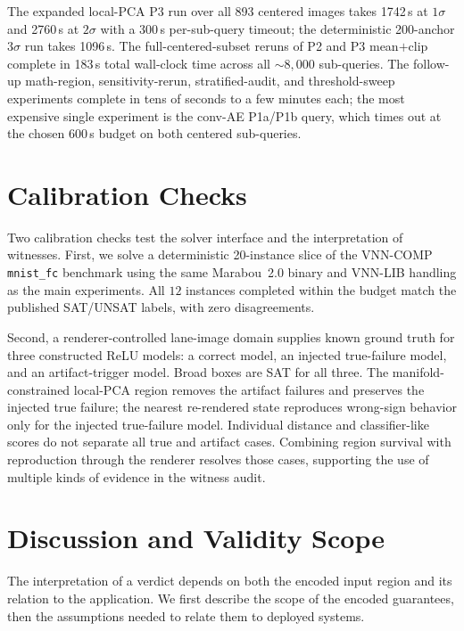 \documentclass[twocolumn,smallextended,runningheads]{svjour3}
\begin{document}
The expanded local-PCA P3 run over all 893 centered images takes 1742\,s at $1\sigma$ and 2760\,s at $2\sigma$ with a 300\,s per-sub-query timeout; the deterministic 200-anchor $3\sigma$ run takes 1096\,s. The full-centered-subset reruns of P2 and P3 mean$+$clip complete in 183\,s total wall-clock time across all $\sim 8{,}000$ sub-queries. The follow-up math-region, sensitivity-rerun, stratified-audit, and threshold-sweep experiments complete in tens of seconds to a few minutes each; the most expensive single experiment is the conv-AE P1a/P1b query, which times out at the chosen $600$\,s budget on both centered sub-queries.

\section{Calibration Checks}
\label{sec:calibration}

Two calibration checks test the solver interface and the interpretation of witnesses. First, we solve a deterministic 20-instance slice of the VNN-COMP \texttt{mnist\_fc} benchmark using the same Marabou~2.0 binary and VNN-LIB handling as the main experiments. All $12$ instances completed within the budget match the published SAT/UNSAT labels, with zero disagreements.

Second, a renderer-controlled lane-image domain supplies known ground truth for three constructed ReLU models: a correct model, an injected true-failure model, and an artifact-trigger model. Broad boxes are SAT for all three. The manifold-constrained local-PCA region removes the artifact failures and preserves the injected true failure; the nearest re-rendered state reproduces wrong-sign behavior only for the injected true-failure model. Individual distance and classifier-like scores do not separate all true and artifact cases. Combining region survival with reproduction through the renderer resolves those cases, supporting the use of multiple kinds of evidence in the witness audit.

\section{Discussion and Validity Scope}
\label{sec:limitations}

The interpretation of a verdict depends on both the encoded input region and its relation to the application. We first describe the scope of the encoded guarantees, then the assumptions needed to relate them to deployed systems.
\end{document}
